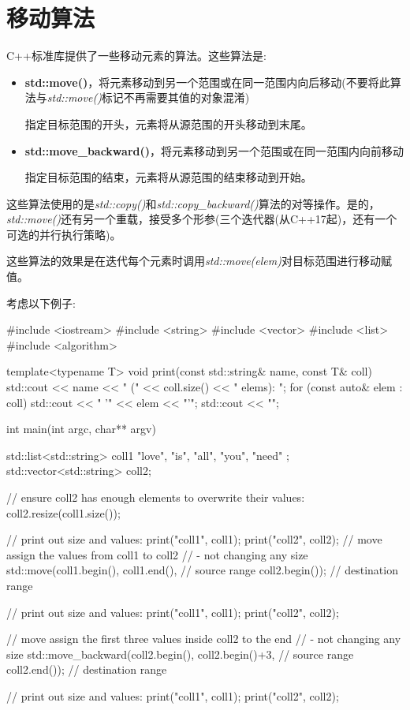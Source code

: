 \section{移动算法}
C++标准库提供了一些移动元素的算法。这些算法是:

\begin{itemize}
	\item \textbf{std::move()}，将元素移动到另一个范围或在同一范围内向后移动(不要将此算法与\textit{std::move()}标记不再需要其值的对象混淆)

	指定目标范围的开头，元素将从源范围的开头移动到末尾。
	\item \textbf{std::move_backward()}，将元素移动到另一个范围或在同一范围内向前移动

	指定目标范围的结束，元素将从源范围的结束移动到开始。
\end{itemize}

这些算法使用的是\textit{std::copy()}和\textit{std::copy_backward()}算法的对等操作。是的，\textit{std::move()}还有另一个重载，接受多个形参(三个迭代器(从C++17起)，还有一个可选的并行执行策略)。

这些算法的效果是在迭代每个元素时调用\textit{std::move(elem)}对目标范围进行移动赋值。

考虑以下例子:

\begin{cppcode}
#include <iostream>
#include <string>
#include <vector>
#include <list>
#include <algorithm>

template<typename T>
void print(const std::string& name, const T& coll)
{
	std::cout << name << " (" << coll.size() << " elems): ";
	for (const auto& elem : coll) {
		std::cout << " '" << elem << "'";
	}
	std::cout << "\n";
}

int main(int argc, char** argv)
{
	std::list<std::string> coll1 { "love", "is", "all", "you", "need" };
	std::vector<std::string> coll2;

	// ensure coll2 has enough elements to overwrite their values:
	coll2.resize(coll1.size());

	// print out size and values:
	print("coll1", coll1);
	print("coll2", coll2);
	// move assign the values from coll1 to coll2
	// - not changing any size
	std::move(coll1.begin(), coll1.end(), // source range
	coll2.begin()); // destination range

	// print out size and values:
	print("coll1", coll1);
	print("coll2", coll2);

	// move assign the first three values inside coll2 to the end
	// - not changing any size
	std::move_backward(coll2.begin(), coll2.begin()+3, // source range
	coll2.end()); // destination range

	// print out size and values:
	print("coll1", coll1);
	print("coll2", coll2);
}
\end{cppcode}

